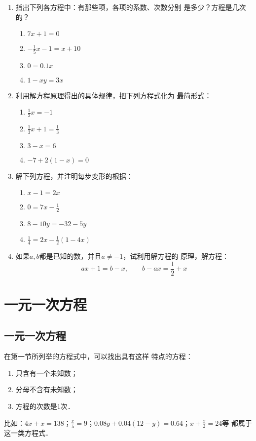 \begin{enumerate}
\item 指出下列各方程中：有那些项，各项的系数、次数分别
是多少？方程是几次的？
\begin{multicols}{2}
\begin{enumerate}
    \item $7x+1=0$
    \item $-\frac{1}{5}x-1=x+10$
    \item $0=0.1x$
    \item $1-xy=3x$
\end{enumerate}
\end{multicols}

\item  利用解方程原理得出的具体规律，把下列方程式化为
最简形式：
\begin{multicols}{2}
\begin{enumerate}
    \item $\frac{1}{2}x=-1$
    \item $\frac{1}{3}x+1=\frac{1}{3}$
    \item $3-x=6$
    \item $-7+2(1-x)=0$
\end{enumerate}
\end{multicols}

\item  解下列方程，并注明每步变形的根据：
\begin{multicols}{2}
    \begin{enumerate}
        \item $x-1=2x$
        \item $0=7x-\frac{1}{2}$
        \item $8-10y=-32-5y$
        \item $\frac{1}{4}=2x-\frac{1}{2}(1-4x)$
    \end{enumerate}
    \end{multicols}

\item  如果$a,  b$都是已知的数，并且$a\ne -1$，试利用解方程的
原理，解方程：
\[ax+1=b-x,\qquad b-ax=\frac{1}{2}+x   \]

\end{enumerate}

\section{一元一次方程}
\subsection{一元一次方程}
    在第一节所列举的方程式中，可以找出具有这样
特点的方程：
\begin{enumerate}
    \item 只含有一个未知数；
    \item 分母不含有未知数；
    \item 方程的次数是1次．
\end{enumerate}
比如：$4x+x = 138$；$\frac{x}{5}=9$；$0.08y+0.04(12-y)=0.64$；$x+\frac{x}{2}=24$等
都属于这一类方程式．

